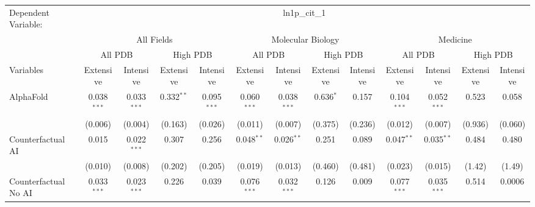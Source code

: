 \begingroup
\centering
\begin{tabular}{lcccccccccccc}
   \tabularnewline \midrule \midrule
   Dependent Variable: & \multicolumn{12}{c}{ln1p\_cit\_1}\\
 & \multicolumn{4}{c}{All Fields} & \multicolumn{4}{c}{Molecular Biology} & \multicolumn{4}{c}{Medicine} \\
\cmidrule(lr){2-5} \cmidrule(lr){6-9} \cmidrule(lr){10-13}
 & \multicolumn{2}{c}{All PDB} & \multicolumn{2}{c}{High PDB} & \multicolumn{2}{c}{All PDB} & \multicolumn{2}{c}{High PDB} & \multicolumn{2}{c}{All PDB} & \multicolumn{2}{c}{High PDB} \\
\cmidrule(lr){2-3} \cmidrule(lr){4-5} \cmidrule(lr){6-7} \cmidrule(lr){8-9} \cmidrule(lr){10-11} \cmidrule(lr){12-13}
Variables & \multicolumn{1}{c}{Extensive} & \multicolumn{1}{c}{Intensive} & \multicolumn{1}{c}{Extensive} & \multicolumn{1}{c}{Intensive} & \multicolumn{1}{c}{Extensive} & \multicolumn{1}{c}{Intensive} & \multicolumn{1}{c}{Extensive} & \multicolumn{1}{c}{Intensive} & \multicolumn{1}{c}{Extensive} & \multicolumn{1}{c}{Intensive} & \multicolumn{1}{c}{Extensive} & \multicolumn{1}{c}{Intensive} \\
\cmidrule(lr){1-1}\cmidrule(lr){2-2} \cmidrule(lr){3-3} \cmidrule(lr){4-4} \cmidrule(lr){5-5} \cmidrule(lr){6-6} \cmidrule(lr){7-7} \cmidrule(lr){8-8} \cmidrule(lr){9-9} \cmidrule(lr){10-10} \cmidrule(lr){11-11} \cmidrule(lr){12-12} \cmidrule(lr){13-13}
   AlphaFold                                & 0.038$^{***}$ & 0.033$^{***}$ & 0.332$^{**}$  & 0.095$^{***}$  & 0.060$^{***}$ & 0.038$^{***}$ & 0.636$^{*}$ & 0.157   & 0.104$^{***}$ & 0.052$^{***}$ & 0.523   & 0.058\\   
                                            & (0.006)       & (0.004)       & (0.163)       & (0.026)        & (0.011)       & (0.007)       & (0.375)     & (0.236) & (0.012)       & (0.007)       & (0.936) & (0.060)\\   
   Counterfactual AI                        & 0.015         & 0.022$^{***}$ & 0.307         & 0.256          & 0.048$^{**}$  & 0.026$^{**}$  & 0.251       & 0.089   & 0.047$^{**}$  & 0.035$^{**}$  & 0.484   & 0.480\\   
                                            & (0.010)       & (0.008)       & (0.202)       & (0.205)        & (0.019)       & (0.013)       & (0.460)     & (0.481) & (0.023)       & (0.015)       & (1.42)  & (1.49)\\   
   Counterfactual No AI                     & 0.033$^{***}$ & 0.023$^{***}$ & 0.226         & 0.039          & 0.076$^{***}$ & 0.032$^{***}$ & 0.126       & 0.009   & 0.077$^{***}$ & 0.035$^{***}$ & 0.514   & 0.0006\\   

\end{tabular}

